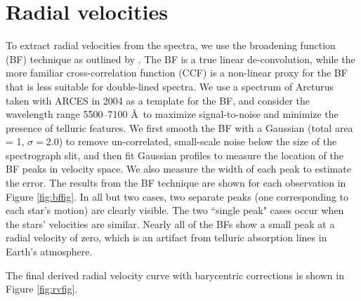 \section{Radial velocities}\label{rvs}
To extract radial velocities from the spectra, we use the broadening function (BF) technique as outlined by \citet{ruc02}. The BF is a true linear de-convolution, while the more familiar cross-correlation function (CCF) is a non-linear proxy for the BF that is less suitable for double-lined spectra. We use a spectrum of Arcturus taken with ARCES in 2004 as a template for the BF, and consider the wavelength range 5500--7100 \AA \ to maximize signal-to-noise and minimize the presence of telluric features. We first smooth the BF with a Gaussian (total area = 1, $\sigma=2.0$)  to remove un-correlated, small-scale noise below the size of the spectrograph slit, and then fit Gaussian profiles to measure the location of the BF peaks in velocity space. We also measure the width of each peak to estimate the error. The results from the BF technique are shown for each observation in Figure \ref{fig:bffig}. In all but two cases, two separate peaks (one corresponding to each star's motion) are clearly visible. The two ``single peak" cases occur when the stars' velocities are similar. Nearly all of the BFs show a small peak at a radial velocity of zero, which is an artifact from telluric absorption lines in Earth's atmosphere.

The final derived radial velocity curve with barycentric corrections is shown in Figure \ref{fig:rvfig}.


